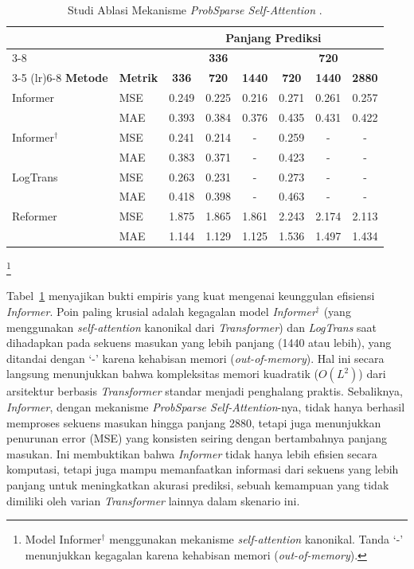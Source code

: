 \begin{table}[H]
\centering
\small %
\caption{Studi Ablasi Mekanisme \textit{ProbSparse Self-Attention} \parencite{Zhou2021}.}
\label{tab:ablation_probsparse} %
\begin{tabular}{ll ccc ccc}
    \toprule
    & & \multicolumn{6}{c}{\textbf{Panjang Prediksi}} \\
    \cmidrule(lr){3-8}
    & & \multicolumn{3}{c}{\textbf{336}} & \multicolumn{3}{c}{\textbf{720}} \\
    \cmidrule(lr){3-5} \cmidrule(lr){6-8}
    \textbf{Metode} & \textbf{Metrik} & \textbf{336} & \textbf{720} & \textbf{1440} & \textbf{720} & \textbf{1440} & \textbf{2880} \\
    \midrule
    Informer & MSE & 0.249 & 0.225 & 0.216 & 0.271 & 0.261 & 0.257 \\
             & MAE & 0.393 & 0.384 & 0.376 & 0.435 & 0.431 & 0.422 \\
    \midrule
    Informer$^{\dag}$ & MSE & 0.241 & 0.214 & - & 0.259 & - & - \\
                      & MAE & 0.383 & 0.371 & - & 0.423 & - & - \\
    \midrule
    LogTrans & MSE & 0.263 & 0.231 & - & 0.273 & - & - \\
             & MAE & 0.418 & 0.398 & - & 0.463 & - & - \\
    \midrule
    Reformer & MSE & 1.875 & 1.865 & 1.861 & 2.243 & 2.174 & 2.113 \\
             & MAE & 1.144 & 1.129 & 1.125 & 1.536 & 1.497 & 1.434 \\
    \bottomrule
\end{tabular}
\footnote{Model Informer$^{\dag}$ menggunakan mekanisme \textit{self-attention} kanonikal. Tanda `-' menunjukkan kegagalan karena kehabisan memori (\textit{out-of-memory}).}
\end{table}

Tabel~\ref{tab:ablation_probsparse} menyajikan bukti empiris yang kuat mengenai keunggulan efisiensi \textit{Informer}. Poin paling krusial adalah kegagalan model \textit{Informer$^{\dag}$} (yang menggunakan \textit{self-attention} kanonikal dari \textit{Transformer}) dan \textit{LogTrans} saat dihadapkan pada sekuens masukan yang lebih panjang (1440 atau lebih), yang ditandai dengan `-' karena kehabisan memori (\textit{out-of-memory}). Hal ini secara langsung menunjukkan bahwa kompleksitas memori kuadratik ($O(L^2)$) dari arsitektur berbasis \textit{Transformer} standar menjadi penghalang praktis. Sebaliknya, \textit{Informer}, dengan mekanisme \textit{ProbSparse Self-Attention}-nya, tidak hanya berhasil memproses sekuens masukan hingga panjang 2880, tetapi juga menunjukkan penurunan error (MSE) yang konsisten seiring dengan bertambahnya panjang masukan. Ini membuktikan bahwa \textit{Informer} tidak hanya lebih efisien secara komputasi, tetapi juga mampu memanfaatkan informasi dari sekuens yang lebih panjang untuk meningkatkan akurasi prediksi, sebuah kemampuan yang tidak dimiliki oleh varian \textit{Transformer} lainnya dalam skenario ini.

